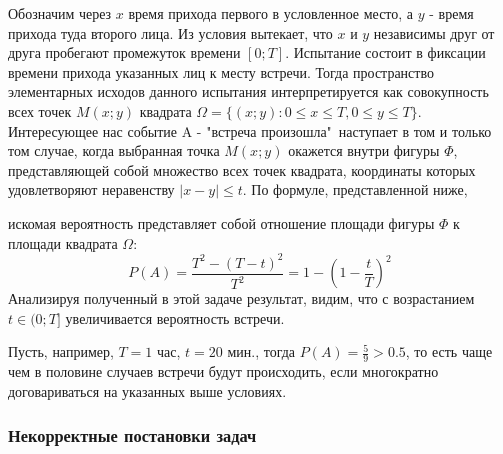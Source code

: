\begin{nonum}
	Обозначим через $x$ время прихода первого в условленное место, а $y$ - время прихода туда второго лица. Из условия вытекает, что $x$ и $y$ независимы друг от друга пробегают промежуток времени  $[0; T]$. Испытание состоит в фиксации времени прихода указанных лиц к месту встречи. Тогда пространство элементарных исходов данного испытания интерпретируется как совокупность всех точек $M(x; y)$ квадрата $\Omega = \{ (x; y) : 0 \le x \le T, 0 \le y \le T \}$.
	Интересующее нас событие A - "встреча произошла"\, наступает в том и только том случае, когда выбранная точка $M(x; y)$ окажется внутри фигуры $\Phi$, представляющей собой множество всех точек квадрата, координаты которых удовлетворяют неравенству $|x-y| \le t$. По формуле, представленной ниже,
	\begin{center}
		\qquad
	\end{center}
	искомая вероятность представляет собой отношение площади фигуры $\Phi$ к площади квадрата $\Omega$:
	\[ P(A) = \frac{T^2 - (T-t)^2}{T^2} = 1 - \left( 1 - \frac{t}{T} \right)^2 \]
	Анализируя полученный в этой задаче результат, видим, что с возрастанием $t \in (0; T]$ увеличивается вероятность встречи.
	
	Пусть, например, $T = 1$ час, $t = 20$ мин., тогда $P(A) = \frac{5}{9} > 0.5$, то есть чаще чем в половине случаев встречи будут происходить, если многократно договариваться на указанных выше условиях.
\end{nonum}

\subsubsection{Некорректные постановки задач}

